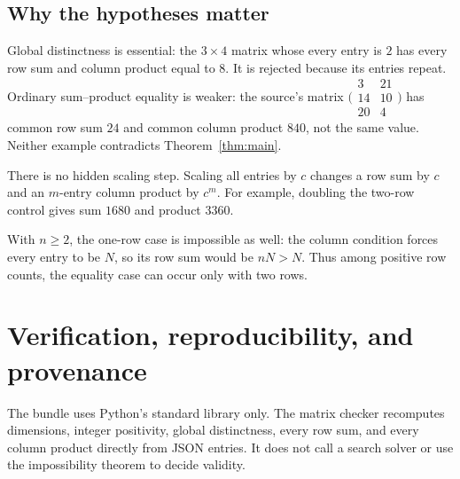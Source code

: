 \documentclass[11pt]{article}
\begin{document}
\subsection*{Why the hypotheses matter}
Global distinctness is essential: the $3\times4$ matrix whose every entry is
$2$ has every row sum and column product equal to $8$. It is rejected because
its entries repeat. Ordinary sum--product equality is weaker: the source's
matrix $\bigl(\begin{smallmatrix}3&21\\14&10\\20&4\end{smallmatrix}\bigr)$
has common row sum $24$ and common column product $840$, not the same value.
Neither example contradicts Theorem~\ref{thm:main}.

There is no hidden scaling step. Scaling all entries by $c$ changes a row sum
by $c$ and an $m$-entry column product by $c^m$. For example, doubling the
two-row control gives sum $1680$ and product $3360$.

With $n\ge2$, the one-row case is impossible as well: the column condition
forces every entry to be $N$, so its row sum would be $nN>N$. Thus among
positive row counts, the equality case can occur only with two rows.

\newpage
\begingroup
\small
\setlength{\parskip}{3pt}
\section{Verification, reproducibility, and provenance}
The bundle uses Python's standard library only. The matrix checker recomputes
dimensions, integer positivity, global distinctness, every row sum, and every
column product directly from JSON entries. It does not call a search solver
or use the impossibility theorem to decide validity.
\end{document}
